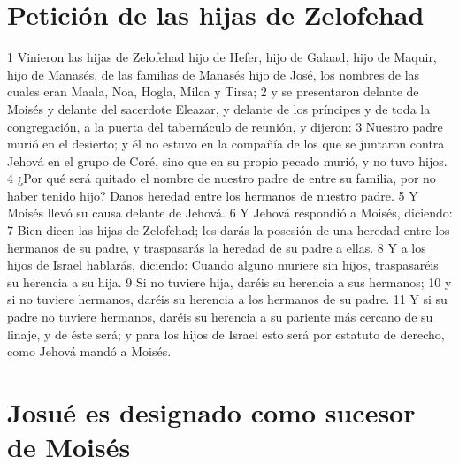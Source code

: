 \section*{Petición de las hijas de Zelofehad}

1 Vinieron las hijas de Zelofehad hijo de Hefer, hijo de Galaad, hijo de Maquir, hijo de Manasés, de las familias de Manasés hijo de José, los nombres de las cuales eran Maala, Noa, Hogla, Milca y Tirsa;
2 y se presentaron delante de Moisés y delante del sacerdote Eleazar, y delante de los príncipes y de toda la congregación, a la puerta del tabernáculo de reunión, y dijeron:
3 Nuestro padre murió en el desierto; y él no estuvo en la compañía de los que se juntaron contra Jehová en el grupo de Coré, sino que en su propio pecado murió, y no tuvo hijos.
4 ¿Por qué será quitado el nombre de nuestro padre de entre su familia, por no haber tenido hijo? Danos heredad entre los hermanos de nuestro padre.
5 Y Moisés llevó su causa delante de Jehová.
6 Y Jehová respondió a Moisés, diciendo:
7 Bien dicen las hijas de Zelofehad; les darás la posesión de una heredad entre los hermanos de su padre, y traspasarás la heredad de su padre a ellas.
8 Y a los hijos de Israel hablarás, diciendo: Cuando alguno muriere sin hijos, traspasaréis su herencia a su hija.
9 Si no tuviere hija, daréis su herencia a sus hermanos;
10 y si no tuviere hermanos, daréis su herencia a los hermanos de su padre.
11 Y si su padre no tuviere hermanos, daréis su herencia a su pariente más cercano de su linaje, y de éste será; y para los hijos de Israel esto será por estatuto de derecho, como Jehová mandó a Moisés.

\section*{Josué es designado como sucesor de Moisés}

